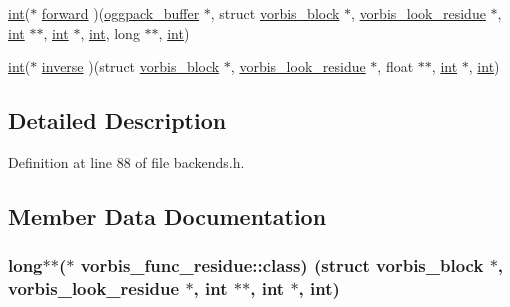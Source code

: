 \begin{DoxyCompactItemize}
\item 
\hyperlink{xmltok_8h_a5a0d4a5641ce434f1d23533f2b2e6653}{int}($\ast$ \hyperlink{structvorbis__func__residue_a33cb44003f0be6c4f5e1fb466e1dd9b9}{forward} )(\hyperlink{structoggpack__buffer}{oggpack\+\_\+buffer} $\ast$, struct \hyperlink{structvorbis__block}{vorbis\+\_\+block} $\ast$, \hyperlink{codec__internal_8h_a88a17b2922962e44ed846e09a212d0f0}{vorbis\+\_\+look\+\_\+residue} $\ast$, \hyperlink{xmltok_8h_a5a0d4a5641ce434f1d23533f2b2e6653}{int} $\ast$$\ast$, \hyperlink{xmltok_8h_a5a0d4a5641ce434f1d23533f2b2e6653}{int} $\ast$, \hyperlink{xmltok_8h_a5a0d4a5641ce434f1d23533f2b2e6653}{int}, long $\ast$$\ast$, \hyperlink{xmltok_8h_a5a0d4a5641ce434f1d23533f2b2e6653}{int})
\item 
\hyperlink{xmltok_8h_a5a0d4a5641ce434f1d23533f2b2e6653}{int}($\ast$ \hyperlink{structvorbis__func__residue_ada986573744a0aa244361bfde8410fd0}{inverse} )(struct \hyperlink{structvorbis__block}{vorbis\+\_\+block} $\ast$, \hyperlink{codec__internal_8h_a88a17b2922962e44ed846e09a212d0f0}{vorbis\+\_\+look\+\_\+residue} $\ast$, float $\ast$$\ast$, \hyperlink{xmltok_8h_a5a0d4a5641ce434f1d23533f2b2e6653}{int} $\ast$, \hyperlink{xmltok_8h_a5a0d4a5641ce434f1d23533f2b2e6653}{int})
\end{DoxyCompactItemize}


\subsection{Detailed Description}


Definition at line 88 of file backends.\+h.



\subsection{Member Data Documentation}
\subsubsection[{\texorpdfstring{class}{class}}]{\setlength{\rightskip}{0pt plus 5cm}long$\ast$$\ast$($\ast$ vorbis\+\_\+func\+\_\+residue\+::class) (struct {\bf vorbis\+\_\+block} $\ast$, {\bf vorbis\+\_\+look\+\_\+residue} $\ast$, {\bf int} $\ast$$\ast$, {\bf int} $\ast$, {\bf int})}\hypertarget{structvorbis__func__residue_ae9c97420751a9c7062cd2f9b3f9145b9}{}\label{structvorbis__func__residue_ae9c97420751a9c7062cd2f9b3f9145b9}


